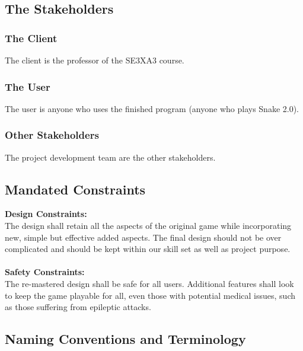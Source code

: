 \documentclass[12pt, titlepage]{article}
\begin{document}
\subsection{The Stakeholders}

\subsubsection{The Client}

The client is the professor of the SE3XA3 course. 

\subsubsection{The User}

The user is anyone who uses the finished program (anyone who plays Snake 2.0).

\subsubsection{Other Stakeholders}

The project development team are the other stakeholders. 

\subsection{Mandated Constraints}

\textbf{Design Constraints:}\\

The design shall retain all the aspects of the original game while incorporating new, simple but effective added aspects. The final design should not be over complicated and should be kept within our skill set as well as project purpose.\\\\
\textbf{Safety Constraints:}\\

The re-mastered design shall be safe for all users. Additional features shall look to keep the game playable for all, even those with potential medical issues, such as those suffering from epileptic attacks.

\subsection{Naming Conventions and Terminology}
\end{document}
